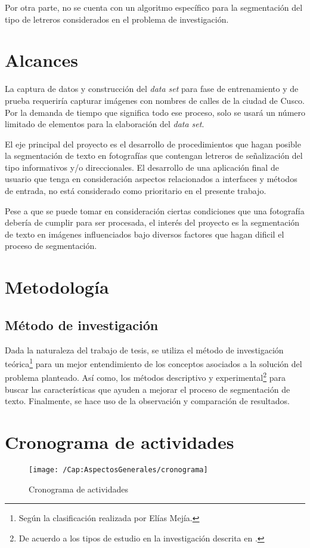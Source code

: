 	Por otra parte, no se cuenta con un algoritmo específico para la segmentación
del tipo de letreros considerados en el problema de investigación.

\section{Alcances}
  La captura de datos y construcción del \textit{data set} para fase de
entrenamiento y de prueba requeriría capturar imágenes con nombres de calles de
la ciudad de Cusco. Por la demanda de tiempo que significa todo ese proceso,
solo se usará un número limitado de elementos para la elaboración del 
\textit{data set}.

  El eje principal del proyecto es el desarrollo de procedimientos que hagan
posible la segmentación de texto en fotografías que contengan letreros de
señalización del tipo informativos y/o direccionales. El desarrollo de una
aplicación final de usuario que tenga en consideración aspectos relacionados a
interfaces y métodos de entrada, no está considerado como prioritario en el
presente trabajo.
  
  Pese a que se puede tomar en consideración ciertas condiciones que una
fotografía debería de cumplir para ser procesada, el interés del proyecto es la
segmentación de texto en imágenes influenciados bajo diversos factores que hagan
dificil el proceso de segmentación.
  
\section{Metodología}
  \subsection{Método de investigación}
  Dada la naturaleza del trabajo de tesis, se utiliza el método de
investigación teórica\footnote{Según la clasificación realizada por Elías
Mejía\citep{Mejia:2005:MIC}.} para un mejor entendimiento de los conceptos
asociados a la solución del problema planteado. Así como, los métodos 
descriptivo y experimental\footnote{De acuerdo a los tipos de
estudio en la investigación descrita en \citep{Hernandez:1999:MI}.} para buscar
las características que ayuden a mejorar el proceso de segmentación de texto.
Finalmente, se hace uso de la observación y comparación de resultados.

\section{Cronograma de actividades}
  \begin{figure}[h!]
    \centering
	  \texttt{[image: /Cap:AspectosGenerales/cronograma]}
	  \caption{Cronograma de actividades}
	  \label{Fig:Cap:AspectosGenerales:Cronograma}
	\end{figure}
